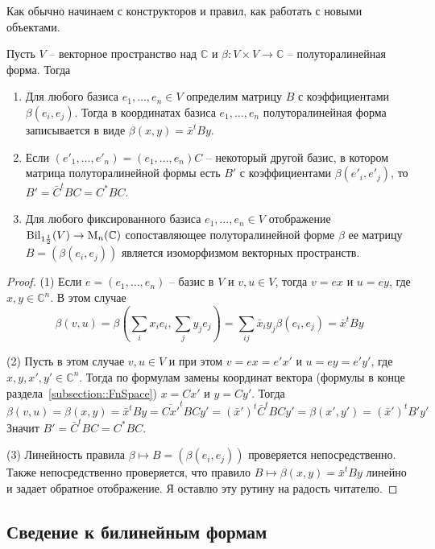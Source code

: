 Как обычно начинаем с конструкторов и правил, как работать с новыми объектами.

\begin{claim}
Пусть $V$ -- векторное пространство над $\mathbb C$ и $\beta \colon V\times V \to \mathbb C$ -- полуторалинейная форма.
Тогда
\begin{enumerate}
\item Для любого базиса $e_1,\ldots,e_n\in V$ определим матрицу $B$ с коэффициентами $\beta(e_i, e_j)$.
Тогда в координатах базиса $e_1,\ldots,e_n$ полуторалинейная форма записывается в виде $\beta(x, y) = \bar x^t B y$.

\item Если $(e'_1,\ldots,e'_n) = (e_1,\ldots,e_n)C$ -- некоторый другой базис, в котором матрица полуторалинейной формы есть $B'$ с коэффициентами $\beta(e'_i,e'_j)$, то $B' = \bar C^t B C = C^* B C$.

\item Для любого фиксированного базиса $e_1,\ldots,e_n\in V$ отображение $\operatorname{Bil}_{1\frac{1}{2}}(V)\to \operatorname{M}_n(\mathbb C)$ сопоставляющее полуторалинейной форме $\beta$ ее матрицу $B = (\beta(e_i,e_j))$ является изоморфизмом векторных пространств.
\end{enumerate}
\end{claim}
\begin{proof}
(1) Если $e = (e_1,\ldots,e_n)$ -- базис в $V$ и $v,u\in V$, тогда $v = ex$ и $u = ey$, где $x,y\in \mathbb C^n$.
В этом случае
\[
\beta(v,u) = \beta(\sum_i x_i e_i, \sum_j y_j e_j) = \sum_{ij}\bar x_i y_j \beta(e_i, e_j) = \bar x^t B y
\]

(2) Пусть в этом случае $v,u\in V$ и при этом $v = ex = e' x'$ и $u = ey = e'y'$, где $x,y,x',y'\in \mathbb C^n$.
Тогда по формулам замены координат вектора (формулы в конце раздела~\ref{subsection::FnSpace}) $x = Cx'$ и $y = Cy'$.
Тогда
\[
\beta(v,u) =\beta(x,y) = \bar x^t B y = \overline{Cx'}^t B C y' = (\bar x')^t \bar C^t B C y' = \beta(x',y') = (\bar x')^t B' y'
\]
Значит $B' = \bar C^t B C = C^* B C$.

(3) Линейность правила $\beta\mapsto B = (\beta(e_i, e_j))$ проверяется непосредственно.
Также непосредственно проверяется, что правило $B\mapsto \beta(x,y) = \bar x^t B y$ линейно и задает обратное отображение.
Я оставлю эту рутину на радость читателю.
\end{proof}

\subsection{Сведение к билинейным формам}

